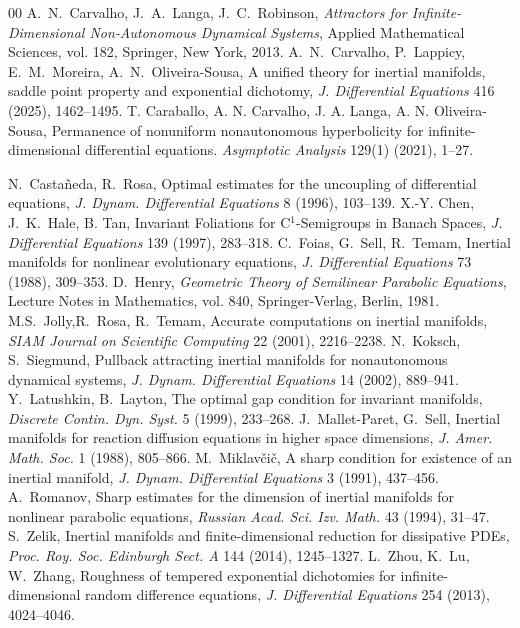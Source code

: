 \documentclass[a4paper,11pt,reqno]{amsart}
\theoremstyle{plain}
\theoremstyle{definition}
\numberwithin{equation}{section}
\begin{document}
\begin{thebibliography}{00}
A.~N.~Carvalho, J.~A.~Langa, J.~C.~Robinson, 
\textit{Attractors for Infinite-Dimensional Non-Autonomous Dynamical Systems}, 
Applied Mathematical Sciences, vol. 182, Springer, New York, 2013.  
%
A.~N.~Carvalho, P.~Lappicy, E.~M.~Moreira, A.~N.~Oliveira-Sousa,
A unified theory for inertial manifolds, saddle point property and exponential dichotomy,
\textit{J. Differential Equations} 416 (2025), 1462--1495.
%
 T. Caraballo, A. N. Carvalho, J. A. Langa, A. N. Oliveira-Sousa, Permanence of nonuniform nonautonomous hyperbolicity for infinite-dimensional differential equations. \textit{Asymptotic Analysis} 129(1) (2021), 1--27.
  
N.~Casta\~neda, R.~Rosa,
Optimal estimates for the uncoupling of differential equations,
\textit{J. Dynam. Differential Equations} 8 (1996), 103--139.
%
 X.-Y. Chen, J.~K.~Hale, B. Tan,
Invariant Foliations for C$^1$-Semigroups in Banach Spaces, \textit{J. Differential Equations} 139 (1997), 283--318.
%
C.~Foias, G.~Sell, R.~Temam, 
Inertial manifolds for nonlinear evolutionary equations, 
\textit{J. Differential Equations} 73 (1988), 309--353.
%
D.~Henry, 
\textit{Geometric Theory of Semilinear Parabolic Equations}, 
Lecture Notes in Mathematics, vol. 840, Springer-Verlag, Berlin, 1981. 
%
 M.S.~Jolly,R.~Rosa, R.~Temam,
Accurate computations on inertial manifolds, \textit{SIAM Journal on Scientific Computing} 22 (2001), 2216--2238.
N.~Koksch, S.~Siegmund,
Pullback attracting inertial manifolds for nonautonomous dynamical systems,
\textit{J. Dynam. Differential Equations} 14 (2002), 889--941.
%
Y.~Latushkin, B.~Layton,
The optimal gap condition for invariant manifolds,
\textit{Discrete Contin. Dyn. Syst.} 5 (1999), 233--268.
%
J.~Mallet-Paret, G.~Sell, 
Inertial manifolds for reaction diffusion equations in higher space dimensions,
\textit{J. Amer. Math. Soc.} 1 (1988), 805--866. 
%
M.~Miklav\v{c}i\v{c}, 
A sharp condition for existence of an inertial manifold, 
\textit{J. Dynam. Differential Equations} 3 (1991), 437--456.
%
A.~Romanov, 
Sharp estimates for the dimension of inertial manifolds for nonlinear parabolic equations, 
\textit{Russian Acad. Sci. Izv. Math.} 43 (1994), 31--47.
%
S.~Zelik, 
Inertial manifolds and finite-dimensional reduction for dissipative PDEs, 
\textit{Proc. Roy. Soc. Edinburgh Sect. A} 144 (2014), 1245--1327. 
%
 L.~Zhou, K.~Lu, W.~Zhang,
Roughness of tempered exponential dichotomies for infinite-dimensional random difference equations,
\textit{J. Differential Equations} 254 (2013), 4024--4046.



\end{thebibliography} 
\end{document}
